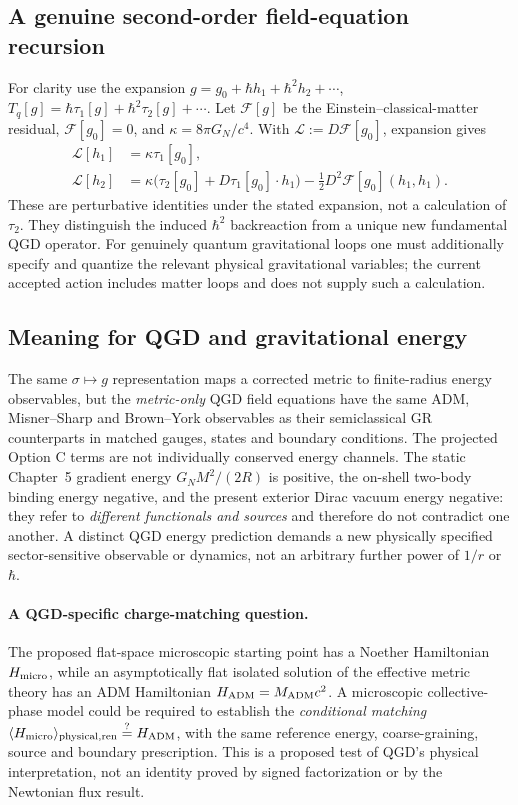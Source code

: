 \documentclass[11pt,a4paper]{article}
\begin{document}
\subsection{A genuine second-order field-equation recursion}
For clarity use the expansion
$g=g_0+\hbar h_1+\hbar^2h_2+\cdots$,
$T_q[g]=\hbar\tau_1[g]+\hbar^2\tau_2[g]+\cdots$.
Let $\mathcal F[g]$ be the Einstein--classical-matter residual,
$\mathcal F[g_0]=0$, and $\kappa=8\pi G_N/c^4$. With
$\mathcal L:=D\mathcal F[g_0]$, expansion gives
\begin{align}
 \mathcal L[h_1]&=\kappa\tau_1[g_0],
 \label{eq:qgd140-h1}\\
 \mathcal L[h_2]&=\kappa\bigl(\tau_2[g_0]
 +D\tau_1[g_0]\cdot h_1\bigr)
 -\tfrac12 D^2\mathcal F[g_0](h_1,h_1).
 \label{eq:qgd140-h2}
\end{align}
These are perturbative identities under the stated expansion, not a
calculation of $\tau_2$. They distinguish the induced
$\hbar^2$ backreaction from a unique new fundamental QGD operator.
For genuinely quantum gravitational loops one must additionally
specify and quantize the relevant physical gravitational variables;
the current accepted action includes matter loops and does not
supply such a calculation.

\subsection{Meaning for QGD and gravitational energy}
The same $\sigma\mapsto g$ representation maps a corrected metric to
finite-radius energy observables, but the \emph{metric-only} QGD
field equations have the same ADM, Misner--Sharp and Brown--York
observables as their semiclassical GR counterparts in matched gauges,
states and boundary conditions. The projected Option C terms are not
individually conserved energy channels. The static Chapter~5 gradient
energy $G_NM^2/(2R)$ is positive, the on-shell two-body binding energy
negative, and the present exterior Dirac vacuum energy negative: they
refer to \emph{different functionals and sources} and therefore do not
contradict one another. A distinct QGD energy prediction demands a
new physically specified sector-sensitive observable or dynamics,
not an arbitrary further power of $1/r$ or $\hbar$.
\paragraph{A QGD-specific charge-matching question.}
The proposed flat-space microscopic starting point has a Noether
Hamiltonian $H_{\rm micro}$, while an asymptotically flat isolated
solution of the effective metric theory has an ADM Hamiltonian
$H_{\rm ADM}=M_{\rm ADM}c^2$. A microscopic collective-phase model
could be required to establish the \emph{conditional matching}
$\langle H_{\rm micro}\rangle_{\rm physical,ren}
\overset{?}{=}H_{\rm ADM}$, with the same reference energy, coarse-graining,
source and boundary prescription. This is a proposed test of QGD's
physical interpretation, not an identity proved by signed factorization
or by the Newtonian flux result.
\end{document}
